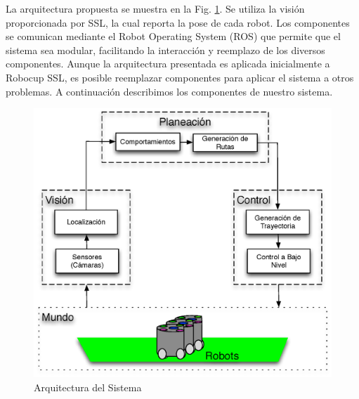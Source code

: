 \documentclass[twocolumn,10pt]{amrob}
\newcommand{\TODO}[1]{{\color{red}{ToDo: {#1}}}}
\begin{document}
La arquitectura propuesta se muestra en la Fig. \ref{fig:ROSGral}. Se utiliza la visión proporcionada por SSL, la cual reporta la pose de cada robot. Los componentes se comunican mediante el Robot Operating System (ROS) que permite que el sistema sea modular, facilitando la interacción y reemplazo de los diversos componentes. Aunque la arquitectura presentada es aplicada inicialmente a Robocup SSL, es posible reemplazar componentes para aplicar el sistema a otros problemas. A continuación describimos los componentes de nuestro sistema.

\begin{figure}
  \centering
    \includegraphics[scale=.5]{arqGeneral.eps}
  \caption{Arquitectura del Sistema}
  \label{fig:ROSGral}
\end{figure}
\end{document}
